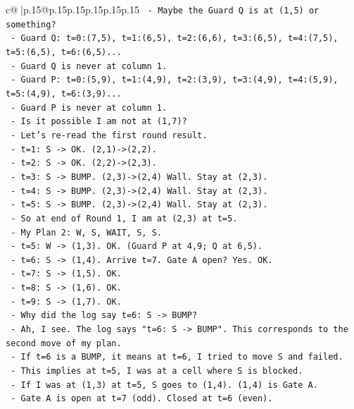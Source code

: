 \documentclass{article}
\begin{document}
{\begin{supertabular}{c@{$\;$}|p{.15\linewidth}@{}p{.15\linewidth}p{.15\linewidth}p{.15\linewidth}p{.15\linewidth}p{.15\linewidth}}
{{{\texttt{  {-} Maybe the Guard Q is at (1,5) or something?} \\
\texttt{  {-} Guard Q: t=0:(7,5), t=1:(6,5), t=2:(6,6), t=3:(6,5), t=4:(7,5), t=5:(6,5), t=6:(6,5)...} \\
\texttt{  {-} Guard Q is never at column 1.} \\
\texttt{  {-} Guard P: t=0:(5,9), t=1:(4,9), t=2:(3,9), t=3:(4,9), t=4:(5,9), t=5:(4,9), t=6:(3,9)...} \\
\texttt{  {-} Guard P is never at column 1.} \\
\texttt{  {-} Is it possible I am not at (1,7)?} \\
\texttt{  {-} Let's re{-}read the first round result.} \\
\texttt{  {-} t=1: S {-}> OK. (2,1){-}>(2,2).} \\
\texttt{  {-} t=2: S {-}> OK. (2,2){-}>(2,3).} \\
\texttt{  {-} t=3: S {-}> BUMP. (2,3){-}>(2,4) Wall. Stay at (2,3).} \\
\texttt{  {-} t=4: S {-}> BUMP. (2,3){-}>(2,4) Wall. Stay at (2,3).} \\
\texttt{  {-} t=5: S {-}> BUMP. (2,3){-}>(2,4) Wall. Stay at (2,3).} \\
\texttt{  {-} So at end of Round 1, I am at (2,3) at t=5.} \\
\texttt{  {-} My Plan 2: W, S, WAIT, S, S.} \\
\texttt{  {-} t=5: W {-}> (1,3). OK. (Guard P at 4,9; Q at 6,5).} \\
\texttt{  {-} t=6: S {-}> (1,4). Arrive t=7. Gate A open? Yes. OK.} \\
\texttt{  {-} t=7: S {-}> (1,5). OK.} \\
\texttt{  {-} t=8: S {-}> (1,6). OK.} \\
\texttt{  {-} t=9: S {-}> (1,7). OK.} \\
\texttt{  {-} Why did the log say t=6: S {-}> BUMP?} \\
\texttt{  {-} Ah, I see. The log says "t=6: S {-}> BUMP". This corresponds to the second move of my plan.} \\
\texttt{  {-} If t=6 is a BUMP, it means at t=6, I tried to move S and failed.} \\
\texttt{  {-} This implies at t=5, I was at a cell where S is blocked.} \\
\texttt{  {-} If I was at (1,3) at t=5, S goes to (1,4). (1,4) is Gate A.} \\
\texttt{  {-} Gate A is open at t=7 (odd). Closed at t=6 (even).} \\
}}}
\end{supertabular}}
\end{document}
